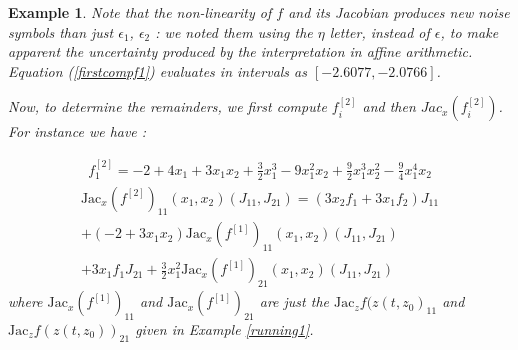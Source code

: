 \documentclass{sig-alternate-05-2015} %
\newtheorem{example}{Example}
\def\intvl#1{\mbox{$[ #1 ]$}}
\begin{document}
\begin{example}
Note that the non-linearity of $f$ and its Jacobian produces new noise symbols than just $\epsilon_1$,
$\epsilon_2$ : we noted them using the $\eta$ letter, instead of $\epsilon$, to make apparent the uncertainty
produced by the interpretation in affine arithmetic. 
Equation (\ref{firstcompf1}) evaluates in intervals
as $\left[-2.6077,-2.0766\right]$.

Now, to determine the remainders, we first compute
$f_i^{[2]}$ and then 
$Jac_x(f_i^{[2]})$. For instance we have : 

\begin{multline}
{f}_1^{[2]} = -2+4x_1+3x_1x_2+\frac{3}{2}x_1^3-9x_1^2x_2
+\frac{9}{2}x_1^3x_2^2-\frac{9}{4}x_1^4x_2
\end{multline}
\begin{multline}
\mbox{Jac}_x(f^{[2]})_{11}(x_1,x_2)(J_{11},J_{21}) = (3x_2f_1+3x_1f_2)J_{11}\\
+(-2+3x_1x_2)\mbox{Jac}_x(f^{[1]})_{11}(x_1,x_2)(J_{11},J_{21}) \\ 
+3x_1f_1J_{21}+\frac{3}{2}x_1^2{\mbox{Jac}_x(f^{[1]})}_{21}(x_1,x_2)(J_{11},J_{21}) 
\label{secondderivative}
\end{multline} %
\noindent where $\mbox{Jac}_x(f^{[1]})_{11}$ %
and ${\mbox{Jac}_x(f^{[1]})}_{21}$ %
are just the $\mbox{Jac}_z f(z(t,z_0)_{11}$ and $\mbox{Jac}_z f(z(t,z_0))_{21}$ given in Example \ref{running1}.


\end{example}
\end{document}
